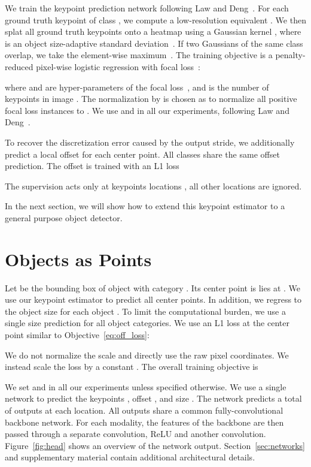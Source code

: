 \documentclass[10pt,twocolumn,letterpaper]{article}
\begin{document}
We train the keypoint prediction network following Law and Deng~\cite{Law_2018_ECCV}.
For each ground truth keypoint  of class , we compute a low-resolution equivalent .
We then splat all ground truth keypoints onto a heatmap  using a Gaussian kernel
,
where  is an object size-adaptive standard deviation~\cite{Law_2018_ECCV}.
If two Gaussians of the same class overlap, we take the element-wise maximum~\cite{cao2017realtime}.
The training objective is a penalty-reduced pixel-wise logistic regression with focal loss~\cite{lin2018focal}:

where  and  are hyper-parameters of the focal loss~\cite{lin2018focal}, and  is the number of keypoints in image .
The normalization by  is chosen as to normalize all positive focal loss instances to .
We use  and  in all our experiments, following Law and Deng~\cite{Law_2018_ECCV}.

To recover the discretization error caused by the output stride, we additionally predict a local offset  for each center point.
All classes  share the same offset prediction.
The offset is trained with an L1 loss

The supervision acts only at keypoints locations , all other locations are ignored.

In the next section, we will show how to extend this keypoint estimator to a general purpose object detector.

\section{Objects as Points}
\label{sec:technic}
Let  be the bounding box of object  with category .
Its center point is lies at .
We use our keypoint estimator  to predict all center points.
In addition, we regress to the object size  for each object .
To limit the computational burden, we use a single size prediction  for all object categories.
We use an L1 loss at the center point similar to Objective~\ref{eq:off_loss}:

We do not normalize the scale and directly use the raw pixel coordinates.
We instead scale the loss by a constant .
The overall training objective is

We set  and  in all our experiments unless specified otherwise.
We use a single network to predict the keypoints , offset , and size .
The network predicts a total of  outputs at each location.
All outputs share a common fully-convolutional backbone network.
For each modality, the features of the backbone are then passed through a separate  convolution, ReLU and another  convolution.
Figure~\ref{fig:head} shows an overview of the network output.
Section~\ref{sec:networks} and supplementary material contain additional architectural details.
\end{document}
